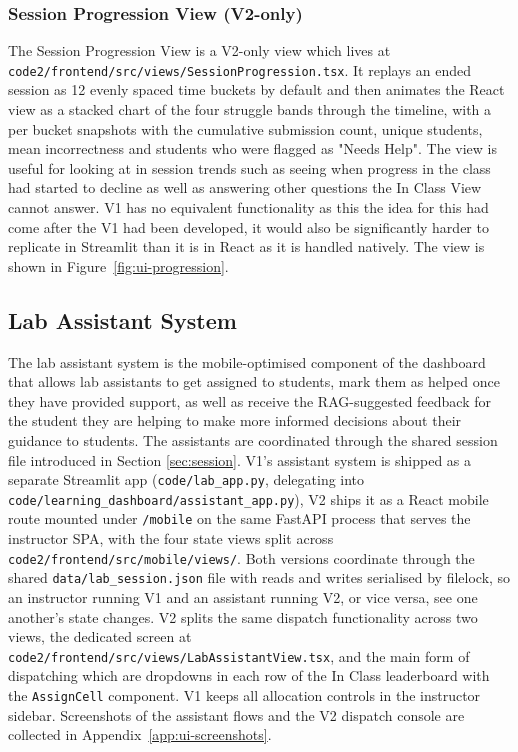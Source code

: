 \subsubsection{Session Progression View (V2-only)}
The Session Progression View is a V2-only view which lives at \texttt{code2/frontend/src/views/SessionProgression.tsx}. 
It replays an ended session as 12 evenly spaced time buckets by default and then animates the React view as a stacked chart of the four struggle bands through the timeline, with a per bucket snapshots with the cumulative submission count, unique students, mean incorrectness and students who were flagged as "Needs Help". 
The view is useful for looking at in session trends such as seeing when progress in the class had started to decline as well as answering other questions the In Class View cannot answer. 
V1 has no equivalent functionality as this the idea for this had come after the V1 had been developed, it would also be significantly harder to replicate in Streamlit than it is in React as it is handled natively. The view is shown in Figure~\ref{fig:ui-progression}.





\subsection{Lab Assistant System} \label{sec:assistant}

The lab assistant system is the mobile-optimised component of the dashboard that allows lab assistants to get assigned to students, mark them as helped once they have provided support, as well as receive the RAG-suggested feedback for the student they are helping to make more informed decisions about their guidance to students. 
The assistants are coordinated through the shared session file introduced in Section \ref{sec:session}. 
V1's assistant system is shipped as a separate Streamlit app (\texttt{code/lab\_app.py}, delegating into \texttt{code/learning\_dashboard/assistant\_app.py}), V2 ships it as a React mobile route mounted under \texttt{/mobile} on the same FastAPI process that serves the instructor SPA, with the four state views split across \texttt{code2/frontend/src/mobile/views/}. 
Both versions coordinate through the shared \texttt{data/lab\_session.json} file with reads and writes serialised by filelock, so an instructor running V1 and an assistant running V2, or vice versa, see one another's state changes. 
V2 splits the same dispatch functionality across two views, the dedicated screen at  \texttt{code2/frontend/src/views/LabAssistantView.tsx}, and the main form of dispatching which are dropdowns in each row of the In Class leaderboard with the \texttt{AssignCell} component. 
V1 keeps all allocation controls in the instructor sidebar. Screenshots of the assistant flows and the V2 dispatch console are collected in Appendix~\ref{app:ui-screenshots}.

